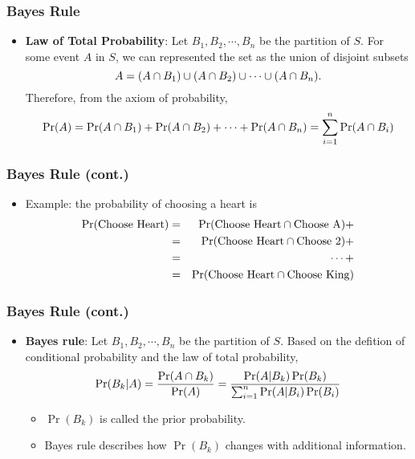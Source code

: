 \documentclass[pdflatex, 12pt]{beamer}
\begin{document}
\begin{frame}
\frametitle{Bayes Rule}
\begin{itemize}
\item \textbf{Law of Total Probability}: Let $B_1, B_2, \cdots, B_n$ be the partition of $S$. For some event $A$ in $S$, we can represented the set as the union of disjoint subsets 
 \begin{equation}
 A = (A \cap B_1) \cup (A \cap B_2) \cup \cdots \cup (A \cap B_n). \notag
 \end{equation}
Therefore, from the axiom of probability,
 {\small
 \begin{equation}
 \Pr(A) = \Pr(A \cap B_1) + \Pr(A \cap B_2) + \cdots + \Pr(A \cap B_n) = \sum_{i = 1}^{n} \Pr(A \cap B_i) \notag
 \end{equation}
 }
\end{itemize}
\end{frame}

\begin{frame}
\frametitle{Bayes Rule (cont.)}
\begin{itemize}
\item Example: the probability of choosing a heart is 
 \begin{eqnarray}
 \Pr(\mathrm{Choose \ Heart}) &=& \Pr(\mathrm{Choose \ Heart} \cap \mathrm{Choose \ A}) + \notag \\
 &=& \Pr(\mathrm{Choose \ Heart} \cap \mathrm{Choose}\ 2) + \notag \\
 &=& \cdots + \notag \\
 &=& \Pr(\mathrm{Choose \ Heart} \cap \mathrm{Choose \ King}) \notag 
 \end{eqnarray}
\end{itemize}
\end{frame}

\begin{frame}
\frametitle{Bayes Rule (cont.)}
\begin{itemize}
\item \textbf{Bayes rule}: Let $B_1, B_2, \cdots, B_n$ be the partition of $S$. Based on the defition of conditional probability and the law of total probability, 
 \begin{equation}
 \Pr(B_k|A) = \frac{\Pr(A \cap B_k)}{\Pr(A)} = \frac{\Pr(A|B_k)\Pr(B_k)}{\sum_{i = 1}^{n} \Pr(A|B_i)\Pr(B_i)} \notag
 \end{equation}
 \begin{itemize}
 \item $\Pr(B_k)$ is called the prior probability.
 \item Bayes rule describes how $\Pr(B_k)$ changes with additional information.
 \end{itemize}
\end{itemize}
\end{frame}
\end{document}
